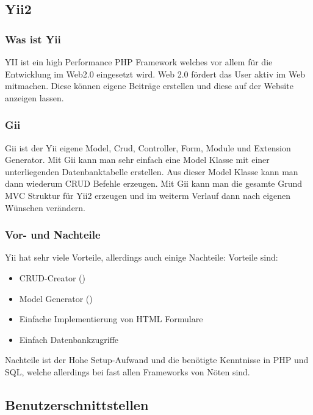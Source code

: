 \subsection{Yii2} \label{sec:YII2}

\subsubsection{Was ist Yii}
YII ist ein high Performance PHP Framework welches vor allem für die Entwicklung im Web2.0 eingesetzt wird. Web 2.0 fördert das User aktiv im Web mitmachen. Diese können eigene Beiträge erstellen und diese auf der Website anzeigen lassen.\cite{Web_2}

\subsubsection{Gii} \label{sec:gii}
Gii ist der Yii eigene Model, Crud, Controller, Form, Module und Extension Generator. Mit Gii kann man sehr einfach eine Model Klasse mit einer unterliegenden Datenbanktabelle erstellen. Aus dieser Model Klasse kann man dann wiederum CRUD Befehle erzeugen. Mit Gii kann man die gesamte Grund MVC Struktur für Yii2 erzeugen und im weiterm Verlauf dann nach eigenen Wünschen verändern.

\subsubsection{Vor- und Nachteile}
Yii hat sehr viele Vorteile, allerdings auch einige Nachteile:
\newline
Vorteile sind:

\begin{itemize}
	\item CRUD-Creator ()
	\item Model Generator ()
	\item Einfache Implementierung von HTML Formulare
	\item Einfach Datenbankzugriffe
\end{itemize}

Nachteile ist der Hohe Setup-Aufwand und die benötigte Kenntnisse in PHP und SQL, welche allerdings bei fast allen Frameworks von Nöten sind.


\subsection{Benutzerschnittstellen} 

